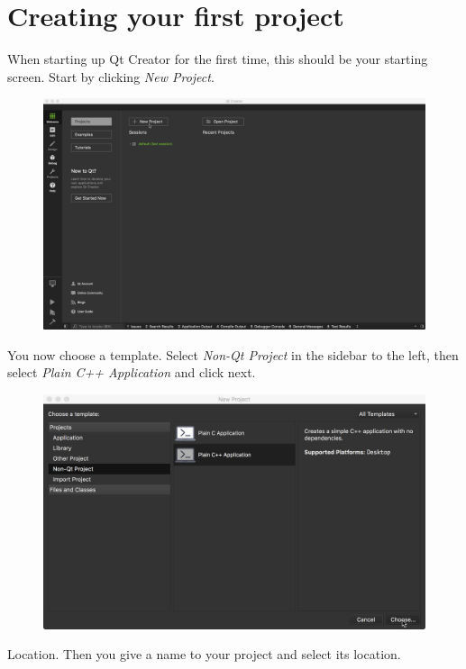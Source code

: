 \documentclass[11pt]{article}
\begin{document}
\section{Creating your first project}
When starting up Qt Creator for the first time, this should be your starting screen. Start by clicking \textit{New Project}.
\begin{figure}[H]
    \centering
    \includegraphics[width=\textwidth]{figures/new_project/select_new_project.png}
\end{figure}
You now choose a template. Select \textit{Non-Qt Project} in the sidebar to the left, then select \textit{Plain C++ Application} and click next.
\begin{figure}[H]
    \centering
    \includegraphics[width=\textwidth]{figures/new_project/non-qt-c++-app.png}
\end{figure}
Location. Then you give a name to your project and select its location.
\end{document}

